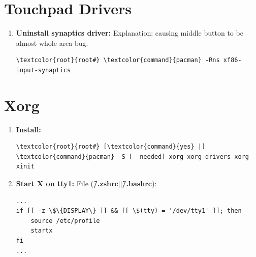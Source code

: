 \documentclass[10pt, a4paper, onecolumn, oneside, titlepage, openany]{book}
\begin{document}
\section{Touchpad Drivers}
\begin{enumerate}
    \item \textbf{Uninstall synaptics driver:}
\newline Explanation: causing middle button to be almost whole area bug.
\begin{Verbatim}[commandchars=\\\{\}]
\textcolor{root}{root#} \textcolor{command}{pacman} -Rns xf86-input-synaptics
\end{Verbatim}    
\end{enumerate}

\section{Xorg}
\begin{enumerate}
    \item \textbf{Install:}
\begin{Verbatim}[commandchars=\\\{\}]
\textcolor{root}{root#} [\textcolor{command}{yes} |] \textcolor{command}{pacman} -S [--needed] xorg xorg-drivers xorg-xinit
\end{Verbatim}
    \item \textbf{Start X on tty1:}
\newline File (\textbf{\textcolor{file}{\~/.zshrc}}||\textbf{\textcolor{file}{\~/.bashrc}}):
\begin{Verbatim}[commandchars=\\\{\}]
...
if [[ -z \$\{DISPLAY\} ]] && [[ \$(tty) = '/dev/tty1' ]]; then
    source /etc/profile
    startx
fi
...
\end{Verbatim}
\end{enumerate}
\end{document}
